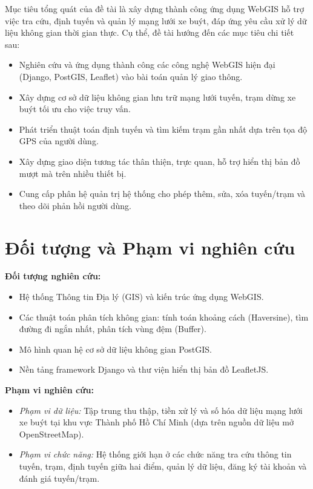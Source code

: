 Mục tiêu tổng quát của đề tài là xây dựng thành công ứng dụng WebGIS hỗ trợ việc tra cứu, định tuyến và quản lý mạng lưới xe buýt, đáp ứng yêu cầu xử lý dữ liệu không gian thời gian thực. Cụ thể, đề tài hướng đến các mục tiêu chi tiết sau:

\begin{itemize}
    \item Nghiên cứu và ứng dụng thành công các công nghệ WebGIS hiện đại (Django, PostGIS, Leaflet) vào bài toán quản lý giao thông.
    \item Xây dựng cơ sở dữ liệu không gian lưu trữ mạng lưới tuyến, trạm dừng xe buýt tối ưu cho việc truy vấn.
    \item Phát triển thuật toán định tuyến và tìm kiếm trạm gần nhất dựa trên tọa độ GPS của người dùng.
    \item Xây dựng giao diện tương tác thân thiện, trực quan, hỗ trợ hiển thị bản đồ mượt mà trên nhiều thiết bị.
    \item Cung cấp phân hệ quản trị hệ thống cho phép thêm, sửa, xóa tuyến/trạm và theo dõi phản hồi người dùng.
\end{itemize}

\section{Đối tượng và Phạm vi nghiên cứu}

\textbf{Đối tượng nghiên cứu:}
\begin{itemize}
    \item Hệ thống Thông tin Địa lý (GIS) và kiến trúc ứng dụng WebGIS.
    \item Các thuật toán phân tích không gian: tính toán khoảng cách (Haversine), tìm đường đi ngắn nhất, phân tích vùng đệm (Buffer).
    \item Mô hình quan hệ cơ sở dữ liệu không gian PostGIS.
    \item Nền tảng framework Django và thư viện hiển thị bản đồ LeafletJS.
\end{itemize}

\textbf{Phạm vi nghiên cứu:}
\begin{itemize}
    \item \textit{Phạm vi dữ liệu:} Tập trung thu thập, tiền xử lý và số hóa dữ liệu mạng lưới xe buýt tại khu vực Thành phố Hồ Chí Minh (dựa trên nguồn dữ liệu mở OpenStreetMap).
    \item \textit{Phạm vi chức năng:} Hệ thống giới hạn ở các chức năng tra cứu thông tin tuyến, trạm, định tuyến giữa hai điểm, quản lý dữ liệu, đăng ký tài khoản và đánh giá tuyến/trạm.
\end{itemize}

